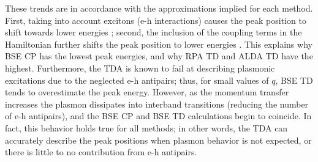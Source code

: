 \documentclass[aps,prb,10pt,showpacs,superscriptaddress,twocolumn,notitlepage]{revtex4-1}
\begin{document}
These trends are in accordance with the approximations implied for each method.
First, taking into account excitons (e-h interactions) causes the peak position
to shift towards lower energies \cite{albrechtPRL98}; second, the inclusion of
the coupling terms in the Hamiltonian further shifts the peak position to lower
energies \cite{olevanoPRL01, gruningNL09}. This explains why BSE CP has the
lowest peak energies, and why RPA TD and ALDA TD have the highest. Furthermore,
the TDA is known to fail at describing plasmonic excitations
\cite{zimmermannPSSB70, caliebePRL00, olevanoPRL01, gruningNL09} due to the
neglected e-h antipairs; thus, for small values of $q$, BSE TD tends to
overestimate the peak energy. However, as the momentum transfer increases the
plasmon dissipates into interband transitions (reducing the number of e-h
antipairs), and the BSE CP and BSE TD calculations begin to coincide. In fact,
this behavior holds true for all methods; in other words, the TDA can accurately
describe the peak positions when plasmon behavior is not expected, or there is
little to no contribution from e-h antipairs.
\end{document}
